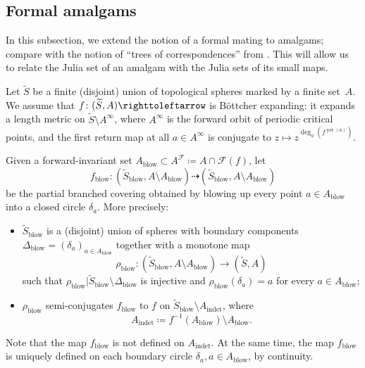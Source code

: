 \documentclass{amsart}
\theoremstyle{plain}
\theoremstyle{definition}
\theoremstyle{remark}
\newcommand{\blowup}{{\operatorname{blow}}}
\renewcommand{\sp}{{\ \ }}
\newcommand{\per}{{\operatorname{per}}}
\newcommand{\Fat}{{\mathcal F}}
\newcommand\selfmap{\righttoleftarrow}
\begin{document}
\subsection{Formal amalgams}\label{ss:FA} In this subsection, we extend the notion of a formal mating to amalgams; compare with the notion of ``trees of correspondences'' from \cite[\S6.2]{BD_Exp}. This will allow us to relate the Julia set of an amalgam with the Julia sets of its small maps.

Let $\widetilde S$ be a finite (disjoint) union of topological spheres marked by a finite set~$A$. We assume that $f\colon (\widetilde S,A)\selfmap$ is B\"ottcher expanding: it expands a length metric on $\widetilde S\setminus A^\infty$, where $A^\infty$ is the forward orbit of periodic critical points, and the first return map at all $a\in A^\infty$ is conjugate to $z\mapsto z^{\deg_a(f^{\per(a)})}$.


Given a forward-invariant set $A_\blowup\subset A^\Fat\coloneq A \cap \Fat(f)$, let 
\begin{equation}
\label{eq:sph map}
 f_\blowup\colon (\widetilde S_\blowup,A\setminus A_\blowup )\dashrightarrow (\widetilde S_\blowup,A\setminus A_\blowup )
\end{equation} 
be the partial branched covering obtained by blowing up every point $a\in A_\blowup$ into a closed circle $\delta_a$. More precisely:
\newcommand{\indet}{{\operatorname{indet}}}
\begin{itemize}
\item %
$\widetilde S_\blowup$ is a (disjoint) union of spheres with boundary components $\Delta_\blowup =(\delta_a)_{a\in A_\blowup}$ together with a monotone map 
\begin{equation}
\label{eq:rho_blowup}
    \rho_\blowup\colon (\widetilde S_\blowup,A\setminus A_\blowup )\to (\widetilde S, A)
\end{equation}    
such that $\rho_\blowup| \widetilde S_\blowup \setminus \Delta_\blowup$ is injective and  $\rho_{\blowup}(\delta_a)=a$  for every $a\in A_\blowup$;
\item $\rho_\blowup$ semi-conjugates $f_\blowup$ to $f$ on $\widetilde S_\blowup \setminus  A_\indet$, where
\[ A_\indet\coloneq  f^{-1}(A_\blowup)\setminus A_\blowup. \]
\end{itemize} 
Note that the map $f_\blowup$ is not defined on $A_\indet$. At the same time, the map $f_\blowup$ is uniquely defined on each boundary circle $\delta_a, a\in A_\blowup $, by continuity.
\end{document}
